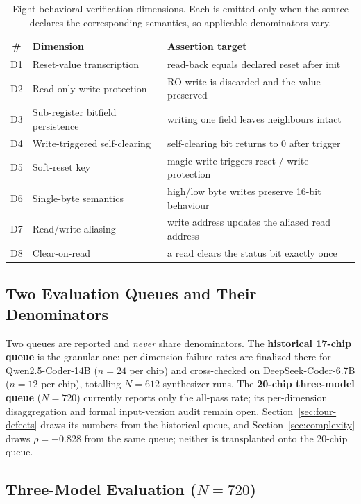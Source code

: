 \documentclass[preprint,review]{elsarticle}
\theoremstyle{definition}
\begin{document}
\begin{table}[t]
\centering
\caption{Eight behavioral verification dimensions. Each is emitted only when the source
declares the corresponding semantics, so applicable denominators vary.}
\label{tab:dims}
\small
\begin{tabular}{@{}c l l@{}}
\toprule
\# & Dimension & Assertion target \\
\midrule
D1 & Reset-value transcription & read-back equals declared reset after init \\
D2 & Read-only write protection & RO write is discarded and the value preserved \\
D3 & Sub-register bitfield persistence & writing one field leaves neighbours intact \\
D4 & Write-triggered self-clearing & self-clearing bit returns to $0$ after trigger \\
D5 & Soft-reset key & magic write triggers reset / write-protection \\
D6 & Single-byte semantics & high/low byte writes preserve 16-bit behaviour \\
D7 & Read/write aliasing & write address updates the aliased read address \\
D8 & Clear-on-read & a read clears the status bit exactly once \\
\bottomrule
\end{tabular}
\end{table}

\subsection{Two Evaluation Queues and Their Denominators}
\label{sec:queues}

Two queues are reported and \emph{never} share denominators. The \textbf{historical 17-chip
queue} is the granular one: per-dimension failure rates are finalized there for
Qwen2.5-Coder-14B ($n=24$ per chip) and cross-checked on DeepSeek-Coder-6.7B ($n=12$ per
chip), totalling $N=612$ synthesizer runs. The \textbf{20-chip three-model queue} ($N=720$)
currently reports only the all-pass rate; its per-dimension disaggregation and formal
input-version audit remain open. Section~\ref{sec:four-defects} draws its numbers from the
historical queue, and Section~\ref{sec:complexity} draws $\rho=-0.828$ from the same queue;
neither is transplanted onto the 20-chip queue.

\subsection{Three-Model Evaluation ($N=720$)}
\label{sec:three-model}
\end{document}
